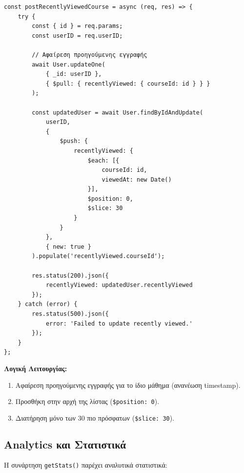 \documentclass[a4paper,12pt]{article}
\begin{document}
\begin{verbatim}
const postRecentlyViewedCourse = async (req, res) => {
    try {
        const { id } = req.params;
        const userID = req.userID;

        // Αφαίρεση προηγούμενης εγγραφής
        await User.updateOne(
            { _id: userID },
            { $pull: { recentlyViewed: { courseId: id } } }
        );

        const updatedUser = await User.findByIdAndUpdate(
            userID,
            {
                $push: {
                    recentlyViewed: {
                        $each: [{ 
                            courseId: id, 
                            viewedAt: new Date() 
                        }],
                        $position: 0,
                        $slice: 30
                    }
                }
            },
            { new: true }
        ).populate('recentlyViewed.courseId');

        res.status(200).json({
            recentlyViewed: updatedUser.recentlyViewed
        });
    } catch (error) {
        res.status(500).json({ 
            error: 'Failed to update recently viewed.' 
        });
    }
};
\end{verbatim}

\textbf{Λογική Λειτουργίας:}
\begin{enumerate}
    \item Αφαίρεση προηγούμενης εγγραφής για το ίδιο μάθημα (ανανέωση timestamp).
    \item Προσθήκη στην αρχή της λίστας (\texttt{\$position: 0}).
    \item Διατήρηση μόνο των 30 πιο πρόσφατων (\texttt{\$slice: 30}).
\end{enumerate}

\subsection{Analytics και Στατιστικά}

Η συνάρτηση \texttt{getStats()} παρέχει αναλυτικά στατιστικά:
\end{document}
